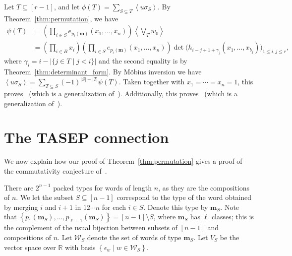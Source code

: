 \documentclass[reqno]{amsart}
\newcommand{\0}{\phantom{c}}
\newcommand{\swt}[1]{\left\langle #1 \right\rangle} %
\newcommand{\mm}{\mathbf{m}}
\newcommand{\mcW}{\mathcal{W}}
\newcommand{\RR}{\mathbb{R}}
\let\sumnonlimits\sum
\let\prodnonlimits\prod
\renewcommand{\sum}{\sumnonlimits\limits}
\renewcommand{\prod}{\prodnonlimits\limits}
\newcommand{\set}[1]{\left\{ #1 \right\}}
\newcommand{\ive}[1]{\left[ #1 \right]}
\theoremstyle{plain}
\theoremstyle{definition}
\numberwithin{equation}{section}
\begin{document}
Let $T \subseteq \ive{r-1}$, and let $\phi(T) = \sum_{S \subseteq T} \swt{u \sigma_S}$.
By Theorem~\ref{thm:permutation}, we have
\begin{align*}
  \psi(T) & = \left(\prod_{i\in S} e_{p_i(\mm)}(x_1, \dotsc, x_n) \right) \swt{ \bigvee_T w_0}
  \\ & = \left( \prod_{i\in B} x_i \right) \left(\prod_{i\in S} e_{p_i(\mm)}(x_1, \dotsc, x_n) \right) \det\bigl(h_{i-j+1+\gamma_j}(x_1, \dotsc, x_{b_j})\bigr)_{1\leq i,j \leq r},
\end{align*}
where $\gamma_i = i - \lvert \{j\in T \mid j < i \} \rvert$ and the second equality is by Theorem~\ref{thm:determinant_form}.
By M\"obius inversion we have $\swt{u \sigma_S} = \sum_{T\subseteq S} (-1)^{|S|-|T|} \psi(T)$.
Taken together with $x_1 = \cdots = x_n = 1$, this proves~\cite[Conj.~3.10]{AasLin17} (which is a generalization of~\cite[Conj.~3.9]{AasLin17}).
Additionally, this proves~\cite[Conj.~3.6]{AasLin17} (which is a generalization of~\cite[Conj.~3.4]{AasLin17}).










\section{The TASEP connection}
\label{sec:tasep}

We now explain how our proof of Theorem~\ref{thm:permutation} gives a proof of the commutativity conjecture of~\cite{AAMP}.

There are $2^{n-1}$ packed types for words of length $n$, as they are the compositions of $n$.
We let the subset $S \subseteq [n-1]$ correspond to the type of the word obtained by merging $i$ and $i+1$ in $12 \dotsm n$ for each $i \in S$.
Denote this type by $\mm_S$.
Note that $\set{p_1(\mm_S), \dotsc, p_{\ell-1}(\mm_S)} = [n-1] \setminus S$, where $\mm_S$ has $\ell$ classes; this is the complement of the usual bijection between subsets of $\ive{n-1}$ and compositions of $n$.
Let $\mcW_S$ denote the set of words of type $\mm_S$.
Let $V_S$ be the vector space over $\RR$ with basis $\set{\epsilon_w \mid w \in \mcW_S}$.
\end{document}
